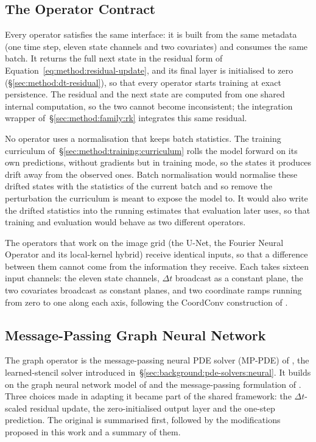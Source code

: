 \subsection{The Operator Contract}
\label{sec:method:family:contract}

Every operator satisfies the same interface: it is built from the same
metadata (one time step, eleven state channels and two covariates) and
consumes the same batch. It returns the full next state in the residual
form of Equation~\eqref{eq:method:residual-update}, and its final layer is
initialised to zero (\S\ref{sec:method:dt-residual}), so that every
operator starts training at exact persistence. The residual and the next
state are computed from one shared internal computation, so the two cannot
become inconsistent; the integration wrapper
of~\S\ref{sec:method:family:rk} integrates this same residual.

No operator uses a normalisation that keeps batch statistics. The training
curriculum of~\S\ref{sec:method:training:curriculum} rolls the model forward on its
own predictions, without gradients but in training mode, so the states it
produces drift away from the observed ones. Batch
normalisation \citep{Ioffe2015} would normalise these drifted states with
the statistics of the current batch and so remove the perturbation the
curriculum is meant to expose the model to. It would also
write the drifted statistics into the running estimates that evaluation
later uses, so that training and evaluation would behave as two different
operators.

The operators that work on the image grid (the U-Net, the Fourier Neural
Operator and its local-kernel hybrid) receive identical inputs, so that a
difference between them cannot come from the information they receive.
Each takes sixteen input channels: the eleven state channels, $\Delta t$
broadcast as a constant plane, the two covariates broadcast as constant
planes, and two coordinate ramps running from zero to one along each axis,
following the CoordConv construction of \citet{Liu2018}.

\subsection{Message-Passing Graph Neural Network}
\label{sec:method:mppde}

The graph operator is the message-passing neural PDE solver (MP-PDE) of
\citet{Brandstetter2022}, the learned-stencil solver introduced
in~\S\ref{sec:background:pde-solvers:neural}. It builds on the graph
neural network model of \citet{Scarselli2009} and the message-passing
formulation of \citet{Gilmer2017}. Three choices made in adapting it
became part of the shared framework: the $\Delta t$-scaled residual
update, the zero-initialised output layer and the one-step prediction. The original is summarised first, followed by
the modifications proposed in this work and a summary of them.

